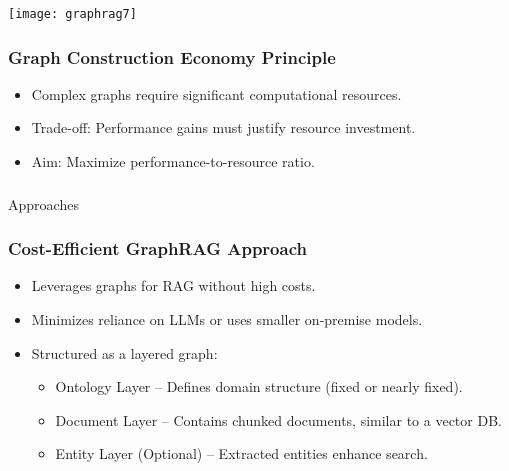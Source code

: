 \begin{frame}[fragile]\frametitle{}

	\begin{center}
	\texttt{[image: graphrag7]}
	\end{center}
	
\end{frame}


	

\begin{frame}[fragile]\frametitle{Graph Construction Economy Principle}
    \begin{itemize}
        \item Complex graphs require significant computational resources.
        \item Trade-off: Performance gains must justify resource investment.
        \item Aim: Maximize performance-to-resource ratio.
    \end{itemize}
\end{frame}


\begin{frame}[fragile]\frametitle{}
\begin{center}
{\Large Approaches}
\end{center}
\end{frame}

\begin{frame}[fragile]\frametitle{Cost-Efficient GraphRAG Approach}
    \begin{itemize}
        \item Leverages graphs for RAG without high costs.
        \item Minimizes reliance on LLMs or uses smaller on-premise models.
        \item Structured as a layered graph:
        \begin{itemize}
            \item Ontology Layer – Defines domain structure (fixed or nearly fixed).
            \item Document Layer – Contains chunked documents, similar to a vector DB.
            \item Entity Layer (Optional) – Extracted entities enhance search.
        \end{itemize}
    \end{itemize}
\end{frame}

